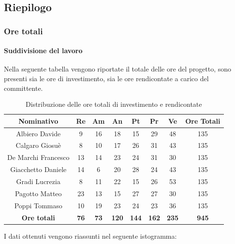 \subsection{Riepilogo}
\subsubsection{Ore totali}
\paragraph{Suddivisione del lavoro}
Nella seguente tabella vengono riportate il totale delle ore del progetto, sono presenti sia le ore di investimento, sia le ore rendicontate a carico del committente.
\begin{table}[H]
		\begin{center}
			\setlength{\aboverulesep}{0pt}
			\setlength{\belowrulesep}{0pt}
			\setlength{\extrarowheight}{.75ex}
			\begin{tabular}{ c c c c c c c c }
				\rowcolor{AzzurroGruppo!30} 
				\textbf{Nominativo} & \textbf{Re} & \textbf{Am} & \textbf{An} & \textbf{Pt} & \textbf{Pr} & \textbf{Ve} & \textbf{Ore Totali}  \\
				\toprule
				Albiero Davide      & 9 & 16 & 18 & 15 & 29 & 48 & 135 \\
				Calgaro Giosuè      & 8 & 10 & 17 & 26 & 31 & 43 & 135 \\
				De Marchi Francesco & 13 & 14 & 23 & 24 & 31 & 30 & 135\\
				Giacchetto Daniele  & 14 & 6 & 20 & 28 & 24 & 43 & 135\\
				Gradi Lucrezia      & 8 & 11 & 22 & 15 & 26 & 53 & 135\\
				Pagotto Matteo      & 23 & 13 & 15 & 27 & 27 & 30 & 135\\
				Poppi Tommaso       & 10 & 19 & 23 & 24 & 23 & 36 & 135\\
				 \textbf{Ore totali} & \textbf{76} & \textbf{73} & \textbf{120} & \textbf{144} & \textbf{162} & \textbf{235} & \textbf{945} \\
				\bottomrule
			\end{tabular}
			\caption{ Distribuzione delle ore totali di investimento e rendicontate}
		\end{center}
	\end{table}
	I dati ottenuti vengono riassunti nel seguente istogramma:
